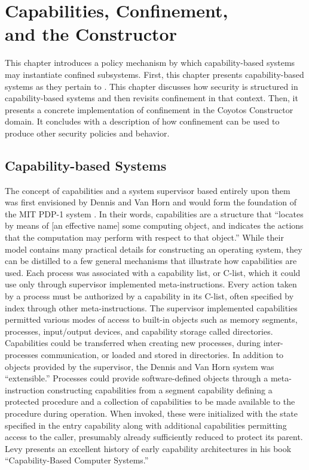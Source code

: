 \chapter[Capabilities, Confinement, and the Constructor]{Capabilities, Confinement, \\ and the Constructor}
\label{ch:constructor}

This chapter introduces a policy mechanism by which capability-based systems may instantiate confined subsystems.
First, this chapter presents capability-based systems as they pertain to \TMmodelName{}.
This chapter discusses how security is structured in capability-based systems and then revisits confinement in that context.
Then, it presents a concrete implementation of confinement in the Coyotos Constructor domain.
It concludes with a description of how confinement can be used to produce other security policies and behavior.

\section{Capability-based Systems}
\label{sect:constructor:capabilitySystems}

The concept of capabilities and a system supervisor based entirely upon them was first envisioned by Dennis and Van Horn \cite{DennisVanHorn:Capabilities} and would form the foundation of the MIT PDP-1 system \cite{Ackerman:1967:IMC}.
In their words, capabilities are a structure that ``locates by means of [an effective name] some computing object, and indicates the actions that the computation may perform with respect to that object.'' \cite{DennisVanHorn:Capabilities}
While their model contains many practical details for constructing an operating system, they can be distilled to a few general mechanisms that illustrate how capabilities are used.
Each process was associated with a capability list, or C-list, which it could use only through supervisor implemented meta-instructions.
Every action taken by a process must be authorized by a capability in its C-list, often specified by index through other meta-instructions.
The supervisor implemented capabilities permitted various modes of access to built-in objects such as memory segments, processes, input/output devices, and capability storage called directories.
Capabilities could be transferred when creating new processes, during inter-processes communication, or loaded and stored in directories.
In addition to objects provided by the supervisor, the Dennis and Van Horn system was ``extensible.''
Processes could provide software-defined objects through a meta-instruction constructing  capabilities from a segment capability defining a protected procedure and a collection of capabilities to be made available to the procedure during operation.
When invoked, these  were initialized with the state specified in the entry capability along with additional capabilities permitting access to the caller, presumably already sufficiently reduced to protect its parent.
Levy presents an excellent history of early capability architectures in his book ``Capability-Based Computer Systems.'' \cite{Levy:1984:CCS}

